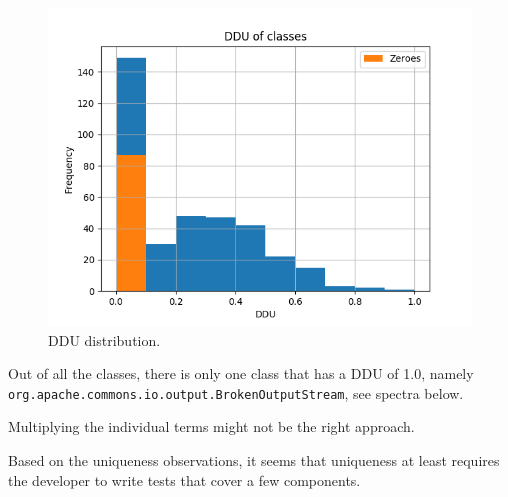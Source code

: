 \begin{figure}
    \centering
    \includegraphics[width=\linewidth]{figures/histogram_ddu}
    \caption{DDU distribution.}
    \label{fig:my_label}
\end{figure}

Out of all the classes, there is only one class that has a DDU of 1.0, namely \texttt{org.apache.commons.io.output.BrokenOutputStream}, see spectra below.

\begin{table}[]
\scriptsize
\centering
\caption{My caption}
\label{my-label}
\noindent{}
\end{table}

Multiplying the individual terms might not be the right approach.

Based on the uniqueness observations, it seems that uniqueness at least requires the developer to write tests that cover a few components.
